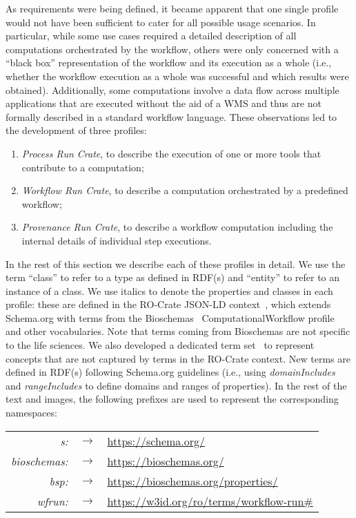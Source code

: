 As requirements were being defined, it became apparent that one single profile would not have been sufficient to cater for all possible usage scenarios.
In particular, while some use cases required a detailed description of all computations orchestrated by the workflow, others were only concerned with a ``black box'' representation of the workflow and its execution as a whole (i.e., whether the workflow execution as a whole was successful and which results were obtained).
Additionally, some computations involve a data flow across multiple applications that are executed without the aid of a WMS and thus are not formally described in a standard workflow language.
These observations led to the development of three profiles:
\begin{enumerate}
    \item \textit{Process Run Crate},
 to describe the execution of one or more tools that contribute to a computation;
    \item \textit{Workflow Run Crate},
 to describe a computation orchestrated by a predefined workflow; 
    \item \textit{Provenance Run Crate},
 to describe a workflow computation including the internal details of individual step executions.
\end{enumerate} 

In the rest of this section we describe each of these profiles in detail. We use the term ``class'' to refer to a type as defined in RDF(s) and ``entity'' to refer to an instance of a class. We use italics to denote the properties and classes in each profile: these are defined in the RO-Crate JSON-LD context~\cite{roc-context}, which extends Schema.org with terms from the Bioschemas~\cite{Gray 2017} ComputationalWorkflow profile~\cite{computational-workflow-profile} and other vocabularies.
Note that terms coming from Bioschemas are not specific to the life sciences.
We also developed a dedicated term set~\cite{wrroc-terms} to represent concepts that are not captured by terms in the RO-Crate context. New terms are defined in RDF(s) following Schema.org guidelines (i.e., using \emph{domainIncludes} and \emph{rangeIncludes} to define domains and ranges of properties). 
In the rest of the text and images, the following prefixes are used to represent the corresponding namespaces:
\begin{tabular}{rcl}
\emph{s:}         & $\rightarrow$ & \url{https://schema.org/} \\
\emph{bioschemas:}& $\rightarrow$ & \url{https://bioschemas.org/} \\
\emph{bsp:}       & $\rightarrow$ & \url{https://bioschemas.org/properties/} \\
\emph{wfrun:}     & $\rightarrow$ & \url{https://w3id.org/ro/terms/workflow-run\#} \\
\end{tabular}



